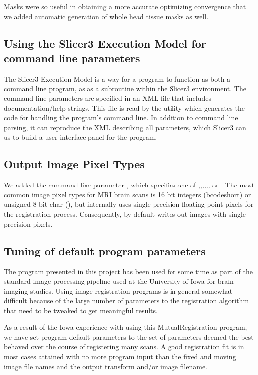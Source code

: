 \documentclass{InsightArticle}
\begin{document}
Masks were so useful in obtaining a more accurate optimizing convergence
that we added automatic generation of whole head tissue masks as well.

\subsection{Using the Slicer3 Execution Model for command line
  parameters}
The Slicer3 Execution Model is a way for a program to function as both
a command line program, as as a subroutine within the Slicer3
environment.  The command line parameters are specified in an XML file
that includes documentation/help strings. This file is read by the
 utility  which generates the code
for handling the program's command line. In addition to command line
parsing, it can reproduce the XML describing all parameters, which
Slicer3 can us to build a user interface panel for the program.

\subsection{Output Image Pixel Types}
We added the command line parameter , which specifies one of ,,,,,, or .   The most common image pixel types for MRI brain scans is 16 bit integers (bcode{short}) or unsigned 8 bit char (), but \miregprog{} internally uses single precision floating point pixels for the registration process. Consequently, by default \miregprog{} writes out images with single precision pixels.  

\subsection{Tuning of default program parameters}
The program presented in this project has been used for some time as
part of the standard image processing pipeline used at the University
of Iowa for brain imaging studies.  Using image registration programs
is in general somewhat difficult because of the large number of
parameters to the registration algorithm that need to be tweaked to
get meaningful results.  

As a result of the Iowa experience with using this MutualRegistration
program, we have set program default parameters to the set of
parameters deemed the best behaved over the course of registering many
scans. A good registration fit is in most cases attained with no more
program input than the fixed and moving image file names and the
output transform and/or image filename.
\end{document}
